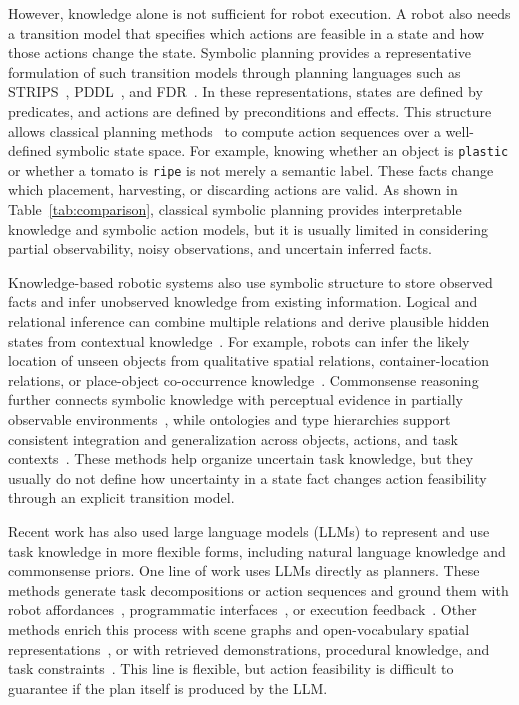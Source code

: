 However, knowledge alone is not sufficient for robot execution. A robot also needs a transition model that specifies which actions are feasible in a state and how those actions change the state. Symbolic planning provides a representative formulation of such transition models through planning languages such as STRIPS~\cite{fikes1971strips}, PDDL~\cite{aeronautiques1998pddl}, and FDR~\cite{helmert2009concise}. In these representations, states are defined by predicates, and actions are defined by preconditions and effects. This structure allows classical planning methods~\cite{hoffmann2001ff,helmert2006fast,correa2024lifted} to compute action sequences over a well-defined symbolic state space. For example, knowing whether an object is \texttt{plastic} or whether a tomato is \texttt{ripe} is not merely a semantic label. These facts change which placement, harvesting, or discarding actions are valid. As shown in Table~\ref{tab:comparison}, classical symbolic planning provides interpretable knowledge and symbolic action models, but it is usually limited in considering partial observability, noisy observations, and uncertain inferred facts.


Knowledge-based robotic systems also use symbolic structure to store observed facts and infer unobserved knowledge from existing information. Logical and relational inference can combine multiple relations and derive plausible hidden states from contextual knowledge~\cite{tenorth2012knowledge,liu2020graph}. For example, robots can infer the likely location of unseen objects from qualitative spatial relations, container-location relations, or place-object co-occurrence knowledge~\cite{kunze2014using,hasegawa2023inferring}. Commonsense reasoning further connects symbolic knowledge with perceptual evidence in partially observable environments~\cite{mota2021integrated,zhang2024icorpp,daruna2019robocse}, while ontologies and type hierarchies support consistent integration and generalization across objects, actions, and task contexts~\cite{mitrevsk2021ontology,olivares2019review,manzoor2021ontology}. These methods help organize uncertain task knowledge, but they usually do not define how uncertainty in a state fact changes action feasibility through an explicit transition model.

Recent work has also used large language models (LLMs) to represent and use task knowledge in more flexible forms, including natural language knowledge and commonsense priors. One line of work uses LLMs directly as planners. These methods generate task decompositions or action sequences and ground them with robot affordances~\cite{ahn2022can,huang2022inner}, programmatic interfaces~\cite{singh2023progprompt,liang2023code}, or execution feedback~\cite{ding2023task}. Other methods enrich this process with scene graphs and open-vocabulary spatial representations~\cite{gu2024conceptgraphs,leanza2025conceptbot}, or with retrieved demonstrations, procedural knowledge, and task constraints~\cite{singh2025adaptbot,zhouenhancing,xu2024p,wang2025instructrag,kumar2026open}. This line is flexible, but action feasibility is difficult to guarantee if the plan itself is produced by the LLM.

